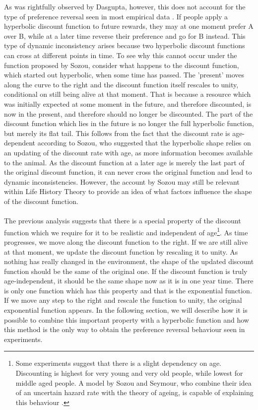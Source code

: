 \documentclass[a4paper,10pt]{article}
\numberwithin{equation}{section}
\begin{document}
As was rightfully observed by Dasgupta, however, this does not account for the type of preference reversal seen in most empirical data \cite{Dasgupta2005}. If people apply a hyperbolic discount function to future rewards, they may at one moment prefer A over B, while at a later time reverse their preference and go for B instead. This type of dynamic inconsistency arises because two hyperbolic discount functions can cross at different points in time. To see why this cannot occur under the function proposed by Sozou, consider what happens to the discount function, which started out hyperbolic, when some time has passed. The 'present' moves along the curve to the right and the discount function itself rescales to unity, conditional on still being alive at that moment. That is because a resource which was initially expected at some moment in the future, and therefore discounted, is now in the present, and therefore should no longer be discounted. The part of the discount function which lies in the future is no longer the full hyperbolic function, but merely its flat tail. This follows from the fact that the discount rate is age-dependent according to Sozou, who suggested that the hyperbolic shape relies on an updating of the discount rate with age, as more information becomes available to the animal. As the discount function at a later age is merely the last part of the original discount function, it can never cross the original function and lead to dynamic inconsistencies. However, the account by Sozou may still be relevant within Life History Theory to provide an idea of what factors influence the shape of the discount function.\\
\\
The previous analysis suggests that there is a special property of the discount function which we require for it to be realistic and independent of age\footnote{Some experiments suggest that there is a slight dependency on age. Discounting is highest for very young and very old people, while lowest for middle aged people. A model by Sozou and Seymour, who combine their idea of an uncertain hazard rate with the theory of ageing, is capable of explaining this behaviour \cite{Sozou2003}.}. As time progresses, we move along the discount function to the right. If we are still alive at that moment, we update the discount function by rescaling it to unity. As nothing has really changed in the environment, the shape of the updated discount function should be the same of the original one. If the discount function is truly age-independent, it should be the same shape now as it is in one year time. There is only one function which has this property and that is the exponential function. If we move any step to the right and rescale the function to unity, the original exponential function appears. In the following section, we will describe how it is possible to combine this important property with a hyperbolic function and how this method is the only way to obtain the preference reversal behaviour seen in experiments.
\end{document}
